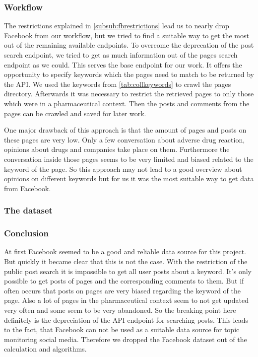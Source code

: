 \documentclass[11pt,titlepage,oneside,openany]{book}
\begin{document}
\subsubsection{Workflow}

The restrictions explained in \autoref{subsub:fbrestrictions} lead us to nearly drop Facebook from our workflow, but we tried to find a suitable way to get the most out of the remaining available endpoints.
To overcome the deprecation of the post search endpoint, we tried to get as much information out of the pages search endpoint as we could. This serves the base endpoint for our work. It offers the opportunity to specify keywords which the pages need to match to be returned by the API. We used the keywords from \autoref{tab:collkeywords} to crawl the pages directory. Afterwards it was necessary to restrict the retrieved pages to only those which were in a pharmaceutical context. Then the posts and comments from the pages can be crawled and saved for later work.\par
One major drawback of this approach is that the amount of pages and posts on these pages are very low. Only a few conversation about adverse drug reaction, opinions about drugs and companies take place on them. Furthermore the conversation inside those pages seems to be very limited and biased related to the keyword of the page.
So this approach may not lead to a good overview about opinions on different keywords but for us it was the most suitable way to get data from Facebook.

\subsubsection{The dataset}
\subsubsection{Conclusion}
At first Facebook seemed to be a good and reliable data source for this project. But quickly it became clear that this is not the case. With the restriction of the public post search it is impossible to get all user posts about a keyword. It’s only possible to get posts of pages and the corresponding comments to them. But if often occurs that posts on pages are very biased regarding the keyword of the page. Also a lot of pages in the pharmaceutical context seem to not get updated very often and some seem to be very abandoned. So the breaking point here definitely is the depreciation of the API endpoint for searching posts. This leads to the fact, that Facebook can not be used as a suitable data source for topic monitoring social media. Therefore we dropped the Facebook dataset out of the calculation and algorithms.
\end{document}
